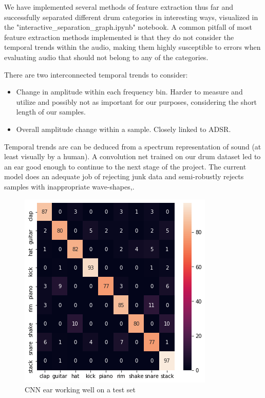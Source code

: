 \documentclass{article}
\begin{document}
We have implemented several methods of feature extraction thus far and successfully separated different drum categories in interesting ways, visualized in the "interactive\_separation\_graph.ipynb" notebook. A common pitfall of most feature extraction methods implemented is that they do not consider the temporal trends within the audio, making them highly susceptible to errors when evaluating audio that should not belong to any of the categories.\\

There are two interconnected temporal trends to consider: 
\begin{itemize}
    \item Change in amplitude within each frequency bin. Harder to measure and utilize and possibly not as important for our purposes, considering the short length of our samples.
    \item Overall amplitude change within a sample. Closely linked to ADSR. 
\end{itemize}{}

Temporal trends are can be deduced from a spectrum representation of sound (at least visually by a human). A convolution net trained on our drum dataset led to an ear good enough to continue to the next stage of the project. The current model does an adequate job of rejecting junk data and semi-robustly rejects samples with inappropriate wave-shapes,.
\begin{figure}[H]
\centering
\includegraphics[width=0.8\linewidth]{images/cnn_ear.png}
\caption{CNN ear working well on a test set}
\label{fig:ok ear}
\end{figure}
\end{document}
